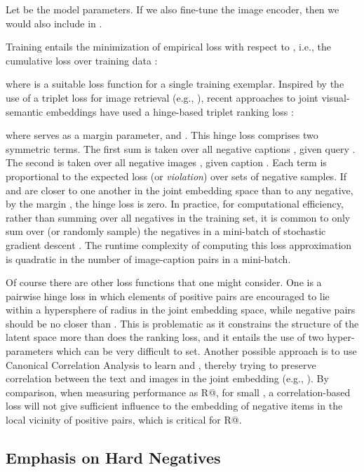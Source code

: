 Let  be the model parameters.  If we also
fine-tune the image encoder, then we would also include  in 
.

Training entails the minimization of empirical loss with respect to , 
i.e., the cumulative loss over training data :

where  is a suitable loss function for a single training 
exemplar.
Inspired by the use of a triplet loss for image retrieval
(e.g., \cite{frome2007learning,chechik2010large}), recent approaches
to joint visual-semantic embeddings have used a hinge-based triplet ranking 
loss \cite{kiros2014unifying, karpathy2015deep, ZhuICCV15, 
socher2014grounded}:

where  serves as a margin parameter, and .  
This hinge loss comprises two symmetric terms.  The first sum is taken over all 
negative captions , given query .  The second is taken over all 
negative images , given caption .  Each term is proportional to the 
expected loss (or {\em violation}\/) over sets of negative samples.  If  and 
 are closer to one another in the joint embedding space than to any 
negative, by the margin , the hinge loss is zero.  In practice, for 
computational efficiency, rather than summing over all  negatives in the 
training set, it is common to only sum over (or randomly sample) the negatives 
in a mini-batch of stochastic gradient descent \cite{kiros2014unifying, 
socher2014grounded, karpathy2015deep}.  The runtime complexity of computing 
this loss approximation is quadratic in the number of image-caption pairs in 
a mini-batch.

Of course there are other loss functions that one might consider.
One  is a pairwise hinge loss in which elements of positive pairs
are encouraged to lie within a hypersphere of radius  in 
the joint embedding space,
while negative pairs should be no closer than .
This is problematic as it constrains the structure of the latent space more 
than does the ranking loss, and it entails the use of two hyper-parameters 
which can be very difficult to set.
Another possible approach is to use Canonical Correlation Analysis to learn 
 and , thereby trying to preserve correlation between the text and 
images in the joint embedding (e.g., 
\cite{klein2015associating,eisenschtat2016linking}).  By comparison, when 
measuring performance as R@, for small , a correlation-based loss will 
not give sufficient influence to the embedding of negative items in the local 
vicinity of positive pairs, which is critical for R@.  

\subsection{Emphasis on Hard Negatives}
\label{sec:hard_neg}

